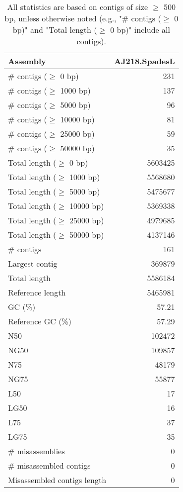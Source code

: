 \documentclass[12pt,a4paper]{article}
\begin{document}
\begin{table}[ht]
\begin{center}
\caption{All statistics are based on contigs of size $\geq$ 500 bp, unless otherwise noted (e.g., "\# contigs ($\geq$ 0 bp)" and "Total length ($\geq$ 0 bp)" include all contigs).}
\begin{tabular}{|l*{1}{|r}|}
\hline
Assembly & AJ218.SpadesL \\ \hline
\# contigs ($\geq$ 0 bp) & 231 \\ \hline
\# contigs ($\geq$ 1000 bp) & 137 \\ \hline
\# contigs ($\geq$ 5000 bp) & 96 \\ \hline
\# contigs ($\geq$ 10000 bp) & 81 \\ \hline
\# contigs ($\geq$ 25000 bp) & 59 \\ \hline
\# contigs ($\geq$ 50000 bp) & 35 \\ \hline
Total length ($\geq$ 0 bp) & 5603425 \\ \hline
Total length ($\geq$ 1000 bp) & 5568680 \\ \hline
Total length ($\geq$ 5000 bp) & 5475677 \\ \hline
Total length ($\geq$ 10000 bp) & 5369338 \\ \hline
Total length ($\geq$ 25000 bp) & 4979685 \\ \hline
Total length ($\geq$ 50000 bp) & 4137146 \\ \hline
\# contigs & 161 \\ \hline
Largest contig & 369879 \\ \hline
Total length & 5586184 \\ \hline
Reference length & 5465981 \\ \hline
GC (\%) & 57.21 \\ \hline
Reference GC (\%) & 57.29 \\ \hline
N50 & 102472 \\ \hline
NG50 & 109857 \\ \hline
N75 & 48179 \\ \hline
NG75 & 55877 \\ \hline
L50 & 17 \\ \hline
LG50 & 16 \\ \hline
L75 & 37 \\ \hline
LG75 & 35 \\ \hline
\# misassemblies & 0 \\ \hline
\# misassembled contigs & 0 \\ \hline
Misassembled contigs length & 0 \\ \hline

\end{tabular}
\end{center}
\end{table}
\end{document}
